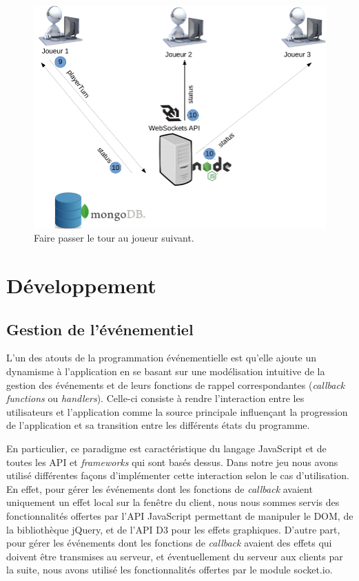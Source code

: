 \documentclass[12pt]{report}
\begin{document}
			\begin{figure}[h!]
		  	\centering
		    \includegraphics[scale=0.5]{images/useCase24.png}
		    \caption{Faire passer le tour au joueur suivant.}
				\label{fig:useCase24}
		  \end{figure}

\chapter{Développement}

  \section{Gestion de l'événementiel}
	L'un des atouts de la programmation événementielle est qu'elle ajoute un dynamisme à l'application en se basant sur une modélisation intuitive de la gestion des événements et de leurs fonctions de rappel correspondantes (\textit{callback functions} ou \textit{handlers}). Celle-ci consiste à rendre l'interaction entre les utilisateurs et l'application comme la source principale influençant la progression de l'application et sa transition entre les différents états du programme.

	En particulier, ce paradigme est caractéristique du langage JavaScript et de toutes les API et \textit{frameworks} qui sont basés dessus. Dans notre jeu nous avons utilisé différentes façons d'implémenter cette interaction selon le cas d'utilisation. En effet, pour gérer les événements dont les fonctions de \textit{callback} avaient uniquement un effet local sur la fenêtre du client, nous nous sommes servis des fonctionnalités offertes par l'API JavaScript permettant de manipuler le DOM, de la bibliothèque jQuery, et de l'API D3 pour les effets graphiques. D'autre part, pour gérer les événements dont les fonctions de \textit{callback} avaient des effets qui doivent être transmises au serveur, et éventuellement du serveur aux clients par la suite, nous avons utilisé les fonctionnalités offertes par le module socket.io.
\end{document}
